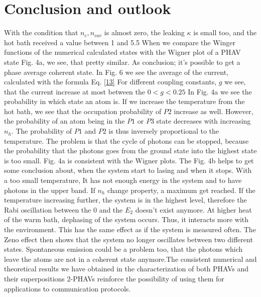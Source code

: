 \documentclass[12pt,a4paper]{article}
\begin{document}
\section{Conclusion and outlook}
With the condition that $n_c, n_{cav}$ is almost zero, the leaking $\kappa$ is small too, and the hot bath received a value between 1 and 5.5 When we compare the Winger functions of the numerical calculated states with the Wigner plot of a PHAV state Fig. 4a, we see, that pretty similar. As conclusion; it's possible to get a phase average coherent state. 
In Fig. 6 we see the average of the current, calculated with the formula Eq. \eqref{13} For different coupling constants, $g$
we see, that the current increase at most between the $ 0<g<0.25$ 
In Fig. 4a we see the probability in which state an atom is. If we increase the temperature from the hot bath, we see that the occupation probability of $P2$ increase as well. However, the probability of an atom being in the $P1$ or $P3$ state decreases with increasing $n_h$. The probability of $P1$ and $P2$ is thus inversely proportional to the temperature.
The problem is that the cycle of photons can be stopped, because the probability that the photons goes from the ground state into the highest state is too small.
Fig. 4a is consistent with the Wigner plots.
The Fig. 4b helps to get some conclusion about, when the system start to lasing and when it stops. With a too small temperature, It has not enough energy in the system and to have photons in the upper band. If $n_h$ change property, a maximum get reached. If the temperature increasing further, the system is in the highest level, therefore the Rabi oscillation between the 0 and the $E_2$ doesn't exist anymore.
At higher heat of the warm bath, dephasing of the system occurs. Thus, it interacts more with the environment. This has the same effect as if the system is measured often. The Zeno effect then shows that the system no longer oscillates between two different states. Spontaneous  emission could be a problem too, that the photons which leave the atoms are not in a coherent state anymore.The consistent numerical and theoretical results we have obtained in the characterization of both PHAVs and their superpositions 2-PHAVs reinforce the
possibility of using them for applications to communication protocols. \cite{Allevi2013} \cite{Niedenzu2019}
\cite{Scovil1959}
\printbibliography
\end{document}
